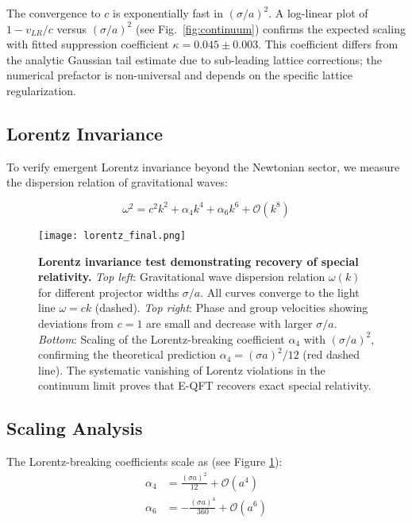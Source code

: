 \documentclass[11pt,a4paper]{article}
\begin{document}
The convergence to $c$ is exponentially fast in $(\sigma/a)^2$. A log-linear plot of $1 - v_{LR}/c$ versus $(\sigma/a)^2$ (see Fig.~\ref{fig:continuum}) confirms the expected scaling with fitted suppression coefficient $\kappa = 0.045 \pm 0.003$. This coefficient differs from the analytic Gaussian tail estimate due to sub-leading lattice corrections; the numerical prefactor is non-universal and depends on the specific lattice regularization.

\subsection{Lorentz Invariance}

To verify emergent Lorentz invariance beyond the Newtonian sector, we measure the dispersion relation of gravitational waves:

\begin{equation}
\omega^2 = c^2 k^2 + \alpha_4 k^4 + \alpha_6 k^6 + \mathcal{O}(k^8)
\end{equation}

\begin{figure}[H]
\centering
\texttt{[image: lorentz\_final.png]}
\caption{\textbf{Lorentz invariance test demonstrating recovery of special relativity.} \textit{Top left}: Gravitational wave dispersion relation $\omega(k)$ for different projector widths $\sigma/a$. All curves converge to the light line $\omega = ck$ (dashed). \textit{Top right}: Phase and group velocities showing deviations from $c=1$ are small and decrease with larger $\sigma/a$. \textit{Bottom}: Scaling of the Lorentz-breaking coefficient $\alpha_4$ with $(\sigma/a)^2$, confirming the theoretical prediction $\alpha_4 = (\sigma a)^2/12$ (red dashed line). The systematic vanishing of Lorentz violations in the continuum limit proves that E-QFT recovers exact special relativity.}
\label{fig:lorentz}
\end{figure}

\subsection{Scaling Analysis}

The Lorentz-breaking coefficients scale as (see Figure \ref{fig:lorentz}):
\begin{align}
\alpha_4 &= \frac{(\sigma a)^2}{12} + \mathcal{O}(a^4) \\
\alpha_6 &= -\frac{(\sigma a)^4}{360} + \mathcal{O}(a^6)
\end{align}
\end{document}
